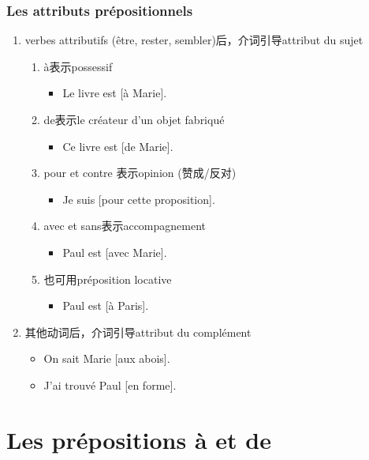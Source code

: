 \documentclass[UTF8]{report}
\begin{document}
\subsubsection{Les attributs prépositionnels}
\begin{enumerate}
    \item verbes attributifs  (être, rester, sembler)后，介词引导attribut du sujet
    \begin{enumerate}
        \item à表示possessif
        \begin{itemize}
            \item Le livre est [à Marie].
        \end{itemize}
        \item de表示le créateur d’un objet fabriqué
        \begin{itemize}
            \item Ce livre est [de Marie].
        \end{itemize}
        \item pour et contre 表示opinion (赞成/反对)
        \begin{itemize}
            \item Je suis [pour cette proposition].
        \end{itemize}
        \item avec et sans表示accompagnement
        \begin{itemize}
            \item Paul est [avec Marie].
        \end{itemize}
        \item 也可用préposition locative
        \begin{itemize}
            \item Paul est [à Paris].
        \end{itemize}
    \end{enumerate}
    \item 其他动词后，介词引导attribut du complément
    \begin{itemize}
        \item On sait Marie [aux abois].
        \item J’ai trouvé Paul [en forme].
    \end{itemize}
\end{enumerate}


\section{Les prépositions à et de}
\end{document}

